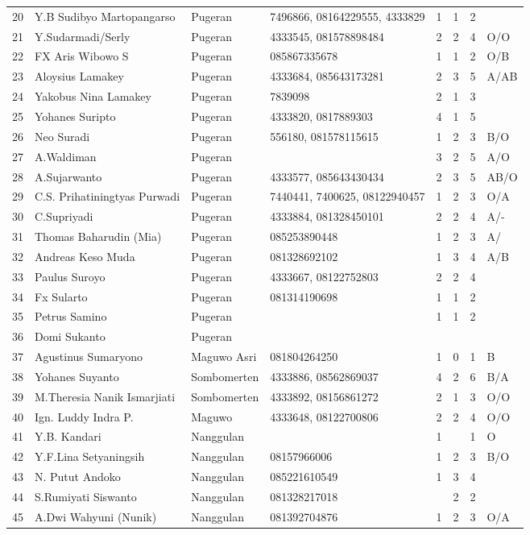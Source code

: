 \documentclass[a5paper,titlepage,11pt]{book}
\begin{document}
\begin{tabular}{|r|l|l|p{1.7cm}|r|r|r|p{0.7cm}|}
20	&Y.B Sudibyo Martopangarso	&Pugeran	&7496866, 08164229555, 4333829	&1	&1	&2	&\\
21	&Y.Sudarmadi/Serly	&Pugeran	&4333545, 081578898484	&2	&2	&4	&O/O\\
22 & FX Aris Wibowo S & Pugeran &085867335678 & 1 & 1 & 2 & O/B\\
23	&Aloysius Lamakey	&Pugeran	&4333684, 085643173281	&2	&3	&5	&A/AB\\
24	&Yakobus Nina Lamakey	&Pugeran	&7839098	&2	&1	&3	&\\
25	&Yohanes Suripto	&Pugeran	&4333820, 0817889303	&4	&1	&5	&\\
26	&Neo Suradi	&Pugeran	&556180, 081578115615	&1	&2	&3	&B/O\\
27	&A.Waldiman	&Pugeran	&	&3	&2	&5	&A/O\\
28	&A.Sujarwanto	&Pugeran	&4333577, 085643430434	&2	&3	&5	&AB/O\\
29	&C.S. Prihatiningtyas Purwadi	&Pugeran	&7440441, 7400625, 08122940457	&1	&2	&3	&O/A\\
30	&C.Supriyadi	&Pugeran	&4333884, 081328450101	&2	&2	&4	&A/-\\
31	&Thomas Baharudin (Mia)	&Pugeran	&085253890448	&1	&2	&3	&A/\\
32	&Andreas Keso Muda	&Pugeran	&081328692102	&1	&3	&4	&A/B\\
33	&Paulus Suroyo	&Pugeran	&4333667, 08122752803	&2	&2	&4	&\\
34	&Fx Sularto	&Pugeran	&081314190698	&1	&1	&2	&\\
35	&Petrus Samino	&Pugeran	&	&1	&1	&2	&\\
36 &Domi Sukanto &Pugeran & & & & &\\
37 &Agustinus Sumaryono&Maguwo Asri&081804264250&1&0&1&B\\
38	&Yohanes Suyanto	&Sombomerten	&4333886, 08562869037	&4	&2	&6	&B/A\\
39	&M.Theresia Nanik Ismarjiati	&Sombomerten	&4333892, 08156861272	&2	&1	&3	&O/O\\
40	&Ign. Luddy Indra P.	&Maguwo	&4333648, 08122700806	&2	&2	&4	&O/O\\
41	&Y.B. Kandari	&Nanggulan 	&	&1	&	&1	&O\\
42	&Y.F.Lina Setyaningsih	&Nanggulan 	&08157966006	&1	&2	&3	&B/O\\
43	&N. Putut Andoko	&Nanggulan 	&085221610549	&1	&3	&4	&\\
44	&S.Rumiyati Siswanto	&Nanggulan 	&081328217018	&	&2	&2	&\\
45	&A.Dwi Wahyuni (Nunik)	&Nanggulan 	&081392704876	&1	&2	&3	&O/A\\

\end{tabular}
\end{document}
